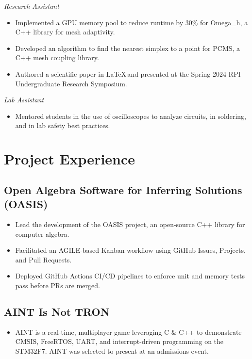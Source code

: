 \documentclass[11pt]{article}
\begin{document}
\textit{Research Assistant}
\begin{itemize}
    \item Implemented a GPU memory pool to reduce runtime by 30\% for Omega\_h, a C++ library for mesh adaptivity.
    \item Developed an algorithm to find the nearest simplex to a point for PCMS, a C++ mesh coupling library.
    \item Authored a scientific paper in \LaTeX\,and presented at the Spring 2024 RPI Undergraduate Research Symposium.
\end{itemize}

\textit{Lab Assistant}
\begin{itemize}
	\item Mentored students in the use of oscilloscopes to analyze circuits, in soldering, and in lab safety best practices.
\end{itemize}

\section*{Project Experience}

\subsection*{Open Algebra Software for Inferring Solutions (OASIS)}
\begin{itemize}
	\item Lead the development of the OASIS project, an open-source C++ library for computer algebra.
	\item Facilitated an AGILE-based Kanban workflow using GitHub Issues, Projects, and Pull Requests.
	\item Deployed GitHub Actions CI/CD pipelines to enforce unit and memory tests pass before PRs are merged.
\end{itemize}

\subsection*{AINT Is Not TRON}
\begin{itemize}
    \item AINT is a real-time, multiplayer game leveraging C \& C++ to demonstrate CMSIS, FreeRTOS, UART, and interrupt-driven programming on the STM32F7. AINT was selected to present at an admissions event.
\end{itemize}
\end{document}
